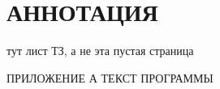 

\section*{АННОТАЦИЯ}


\newpage
тут лист ТЗ, а не эта пустая страница

\renewcommand{\contentsname}{\normalsize \bfseries СОДЕРЖАНИЕ}
\tableofcontents
\noindent 
ПРИЛОЖЕНИЕ А ТЕКСТ ПРОГРАММЫ

\newcommand{\GPRPhantomSection}[2]{{
    \newpage
    \phantomsection
    \addcontentsline{toc}{section}{#1}
    \section*{#1}
    
    \newpage
}}
\newcommand{\GPRSectionHeader}[1]{{
    \newpage
    \section{#1}
}}
\newcommand{\GPRSection}[2]{{
    \def \VarGPRSection {#2}
    \newpage
    \section{#1}
    
    \newpage
}}
\newcommand{\GPRSectionFile}[2]{{
    \def \VarGPRSection {#2}
    \newpage
    \section{#1}
    
    \newpage
}}
\newcommand{\GPRSubSectionHeader}[1]{{
    \subsection{#1}
}}
\newcommand{\GPRSubSubSectionHeader}[1]{{
    \subsubsection{#1}
}}
\newcommand{\GPRSubSection}[2]{{
    \GPRSubSectionHeader{#1}
    
}}
\newcommand{\GPREconomicSection}[2]{{
    \def \VarGPREconomicAnnotaion {#1}
    \def \VarGPREconomicConclusion {#2}
    
    \newpage
}}
